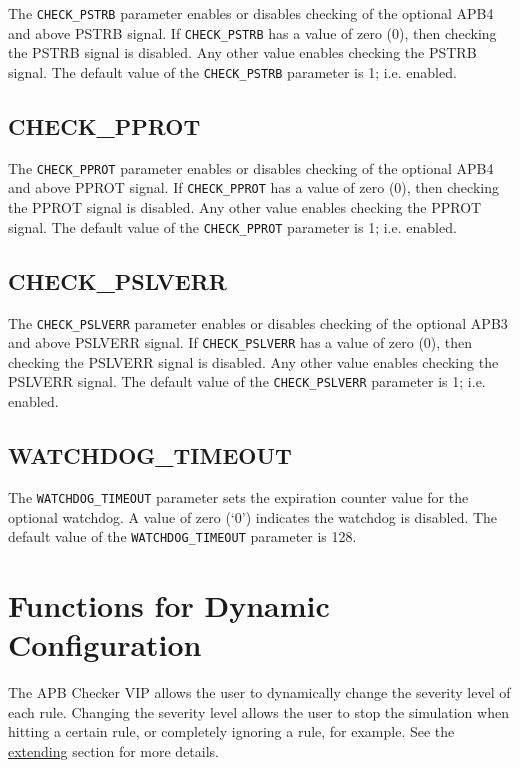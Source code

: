 The \texttt{CHECK\_PSTRB} parameter enables or disables checking of the optional APB4 and above PSTRB signal. If \texttt{CHECK\_PSTRB} has a value of zero (0), then checking the PSTRB signal is disabled. Any other value enables checking the PSTRB signal. The default value of the \texttt{CHECK\_PSTRB} parameter is 1; i.e. enabled.

\subsection{CHECK\_PPROT}\label{check_pprot}

The \texttt{CHECK\_PPROT} parameter enables or disables checking of the optional APB4 and above PPROT signal. If \texttt{CHECK\_PPROT} has a value of zero (0), then checking the PPROT signal is disabled. Any other value enables checking the PPROT signal. The default value of the \texttt{CHECK\_PPROT} parameter is 1; i.e. enabled.

\subsection{CHECK\_PSLVERR}\label{check_pslverr}

The \texttt{CHECK\_PSLVERR} parameter enables or disables checking of the optional APB3 and above PSLVERR signal. If \texttt{CHECK\_PSLVERR} has a value of zero (0), then checking the PSLVERR signal is disabled. Any other value enables checking the PSLVERR signal. The default value of the \texttt{CHECK\_PSLVERR} parameter is 1; i.e. enabled.

\subsection{WATCHDOG\_TIMEOUT}\label{watchdog_timeout}

The \texttt{WATCHDOG\_TIMEOUT} parameter sets the expiration counter value for the optional watchdog. A value of zero (`0') indicates the watchdog is disabled. The default value of the \texttt{WATCHDOG\_TIMEOUT} parameter is 128.


\section{Functions for Dynamic Configuration}\label{dynamic_configuration}

The APB Checker VIP allows the user to dynamically change the severity level of each rule. Changing the severity level allows the user to stop the simulation when hitting a certain rule, or completely ignoring a rule, for example.
See the \hyperref[extending]{extending} section for more details.

